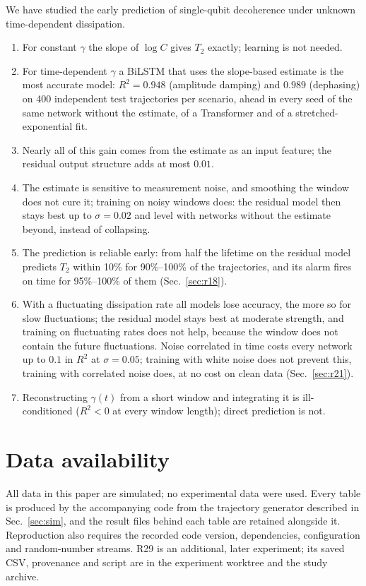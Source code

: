 \documentclass[twocolumn,10pt]{article}
\begin{document}
We have studied the early prediction of single-qubit decoherence under
unknown time-dependent dissipation.
\begin{enumerate}
  \item For constant $\gamma$ the slope of $\log C$ gives $T_2$ exactly;
    learning is not needed.
  \item For time-dependent $\gamma$ a BiLSTM that uses the slope-based
    estimate is the most accurate model: $R^2 = 0.948$ (amplitude
    damping) and $0.989$ (dephasing) on 400 independent test trajectories
    per scenario, ahead in every seed of the same network without the
    estimate, of a Transformer and of a stretched-exponential fit.
  \item Nearly all of this gain comes from the estimate as an input
    feature; the residual output structure adds at most $0.01$.
  \item The estimate is sensitive to measurement noise, and smoothing
    the window does not cure it; training on noisy windows does: the
    residual model then stays best up to $\sigma = 0.02$ and level with
    networks without the estimate beyond, instead of collapsing.
  \item The prediction is reliable early: from half the lifetime on the
    residual model predicts $T_2$ within 10\% for 90\%--100\% of the
    trajectories, and its alarm fires on time for 95\%--100\% of them
    (Sec.~\ref{sec:r18}).
  \item With a fluctuating dissipation rate all models lose accuracy, the
    more so for slow fluctuations; the residual model stays best at
    moderate strength, and training on fluctuating rates does not help,
    because the window does not contain the future fluctuations. Noise
    correlated in time costs every network up to $0.1$ in $R^2$ at
    $\sigma = 0.05$; training with white noise does not prevent this,
    training with correlated noise does, at no cost on clean data
    (Sec.~\ref{sec:r21}).
  \item Reconstructing $\gamma(t)$ from a short window and integrating it
    is ill-conditioned ($R^2 < 0$ at every window length); direct
    prediction is not.
\end{enumerate}

\section*{Data availability}
All data in this paper are simulated; no experimental data were used.
Every table is produced by the accompanying code from the trajectory
generator described in Sec.~\ref{sec:sim}, and the result files behind
each table are retained alongside it.
Reproduction also requires the recorded code version, dependencies,
configuration and random-number streams. R29 is an additional, later
experiment; its saved CSV, provenance and script are in the experiment
worktree and the study archive.
\end{document}
